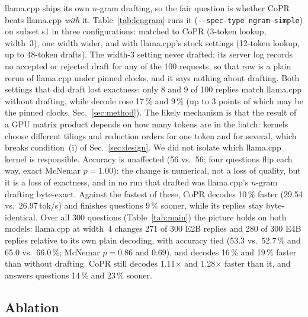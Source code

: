 \documentclass[lettersize,journal]{IEEEtran}
\newcommand{\sys}{CoPR}
\newcommand{\lc}{llama.cpp}
\begin{document}
\lc{} ships its own $n$-gram drafting, so the fair question is whether \sys{}
beats \lc{} \emph{with} it. Table~\ref{tab:lcngram} runs it
(\texttt{-{}-spec-type ngram-simple}) on subset s1 in
three configurations: matched to \sys{} (3-token lookup, width~3), one width
wider, and with \lc{}'s stock settings (12-token lookup, up to 48-token
drafts). The width-3 setting never drafted: its server log records no
accepted or rejected draft for any of the 100 requests, so that row is a plain
rerun of \lc{} under pinned clocks, and it says nothing about drafting. Both
settings that did draft lost exactness: only 8 and 9 of 100 replies match \lc{}
without drafting, while decode rose 17\,\% and 9\,\% (up to 3 points of which
may be the pinned clocks, Sec.~\ref{sec:method}). The likely mechanism is that
the result of a GPU matrix product depends on how many tokens are in the batch:
kernels choose different tilings and reduction orders for one token and for
several, which breaks condition~(i) of Sec.~\ref{sec:design}. We did not
isolate which \lc{} kernel is responsible. Accuracy is unaffected (56 vs.\
56; four questions flip each way, exact McNemar $p{=}1.00$): the change is
numerical, not a loss of quality, but it is a loss of exactness, and in no run
that drafted was \lc{}'s $n$-gram drafting byte-exact. Against the fastest of
these, \sys{} decodes 10\,\% faster (29.54 vs.\ 26.97\,tok/s) and finishes
questions 9\,\% sooner, while its replies stay byte-identical. Over all 300 questions (Table~\ref{tab:main}) the
picture holds on both models: \lc{} at width~4 changes 271 of 300 E2B replies
and 280 of 300 E4B replies relative to its own plain decoding, with accuracy
tied (53.3 vs.\ 52.7\,\% and 65.0 vs.\ 66.0\,\%; McNemar $p{=}0.86$ and
$0.69$), and decodes 16\,\% and 19\,\% faster than without drafting. \sys{}
still decodes 1.11$\times$ and 1.28$\times$ faster than it, and answers
questions 14\,\% and 23\,\% sooner.

\subsection{Ablation}
\end{document}
